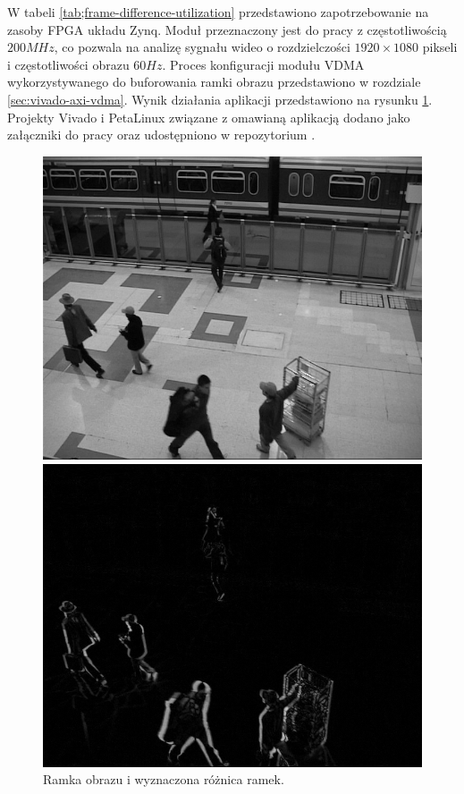 W tabeli \ref{tab;frame-difference-utilization} przedstawiono zapotrzebowanie na zasoby FPGA układu Zynq.
Moduł przeznaczony jest do pracy z częstotliwością $200MHz$, co pozwala na analizę sygnału wideo o rozdzielczości $1920 \times 1080$ pikseli i częstotliwości obrazu $60Hz$.
Proces konfiguracji modułu VDMA wykorzystywanego do buforowania ramki obrazu przedstawiono w rozdziale \ref{sec:vivado-axi-vdma}.
Wynik działania aplikacji przedstawiono na rysunku \ref{fig:frame-difference-result}. 
Projekty Vivado i PetaLinux związane z omawianą aplikacją dodano jako załączniki do pracy oraz udostępniono w repozytorium \cite{git-repository}.
\begin{figure}[H]
	\centering
	\begin{minipage}[b]{0.49\textwidth}
		\includegraphics[width=\textwidth]{img/fd-frame.png}
	\end{minipage}
	\hfill
	\begin{minipage}[b]{0.49\textwidth}
		\includegraphics[width=\textwidth]{img/fd-diff.png}
	\end{minipage}
	\caption{Ramka obrazu i wyznaczona różnica ramek.}
	\label{fig:frame-difference-result}
\end{figure}
